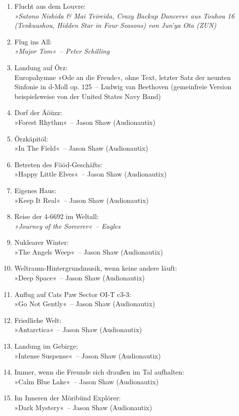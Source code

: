 \begin{enumerate}
    \item Flucht aus dem Louvre:\\ \textit{»Satono Nishida \& Mai Teireida, Crazy Backup Dancers« aus Touhou 16 (Tenkuushou, Hidden Star in Four Seasons) von Jun'ya Ota (ZUN)}
    \item Flug ins All:\\ \textit{»Major Tom«~– Peter Schilling}
    \item Landung auf Örz:\\ Europahymne »Ode an die Freude«, ohne Text, letzter Satz der neunten Sinfonie in d-Moll op. 125~– Ludwig van Beethoven (gemeinfreie Version beispielsweise von der United States Navy Band)
    \item Dorf der Äöüzz:\\ »Forest Rhythm«~– Jason Shaw (Audionautix)
    \item Örzkäpitöl:\\ »In The Field«~– Jason Shaw (Audionautix)
    \item Betreten des Fööd-Geschäfts:\\ »Happy Little Elves«~– Jason Shaw (Audionautix)
    \item Eigenes Haus:\\ »Keep It Real«~– Jason Shaw (Audionautix)
    \item Reise der 4-6692 im Weltall:\\ \textit{»Journey of the Sorcerer«~– Eagles}
    \item Nuklearer Winter:\\ »The Angels Weep«~– Jason Shaw (Audionautix)
    \item Weltraum-Hintergrundmusik, wenn keine andere läuft:\\ »Deep Space«~– Jason Shaw (Audionautix)
    \item Anflug auf Cats Paw Sector OI-T c3-3:\\ »Go Not Gently«~– Jason Shaw (Audionautix)
    \item Friedliche Welt:\\ »Antarctica«~– Jason Shaw (Audionautix)
    \item Landung im Gebirge:\\ »Intense Suspense«~– Jason Shaw (Audionautix)
    \item Immer, wenn die Freunde sich draußen im Tal aufhalten:\\ »Calm Blue Lake«~– Jason Shaw (Audionautix)
    \item Im Inneren der Möribünd Explörer:\\ »Dark Mystery«~– Jason Shaw (Audionautix)

\end{enumerate}
